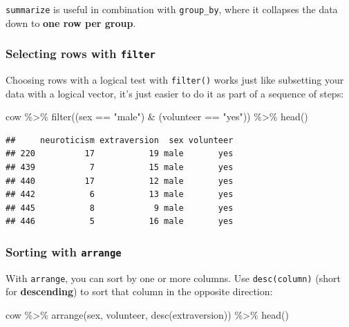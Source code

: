 \documentclass[
]{book}
\newenvironment{Shaded}{\begin{snugshade}}{\end{snugshade}}
\newcommand{\FunctionTok}[1]{\textcolor[rgb]{0.00,0.00,0.00}{#1}}
\newcommand{\NormalTok}[1]{#1}
\newcommand{\SpecialCharTok}[1]{\textcolor[rgb]{0.00,0.00,0.00}{#1}}
\newcommand{\StringTok}[1]{\textcolor[rgb]{0.31,0.60,0.02}{#1}}
\begin{document}
\texttt{summarize} is useful in combination with \texttt{group\_by}, where it
collapses the data down to \textbf{one row per group}.

\hypertarget{selecting-rows-with-filter}{%
\subsubsection*{\texorpdfstring{Selecting rows with \texttt{filter}}{Selecting rows with filter}}\label{selecting-rows-with-filter}}

Choosing rows with a logical test with \texttt{filter()} works just like
subsetting your data with a logical vector, it's just easier
to do it as part of a sequence of steps:

\begin{Shaded}
\begin{Highlighting}[]
\NormalTok{cow }\SpecialCharTok{\%\textgreater{}\%}
  \FunctionTok{filter}\NormalTok{((sex }\SpecialCharTok{==} \StringTok{"male"}\NormalTok{) }\SpecialCharTok{\&}\NormalTok{ (volunteer }\SpecialCharTok{==} \StringTok{"yes"}\NormalTok{)) }\SpecialCharTok{\%\textgreater{}\%}
  \FunctionTok{head}\NormalTok{()}
\end{Highlighting}
\end{Shaded}

\begin{verbatim}
##     neuroticism extraversion  sex volunteer
## 220          17           19 male       yes
## 439           7           15 male       yes
## 440          17           12 male       yes
## 442           6           13 male       yes
## 445           8            9 male       yes
## 446           5           16 male       yes
\end{verbatim}

\hypertarget{sorting-with-arrange}{%
\subsubsection*{\texorpdfstring{Sorting with \texttt{arrange}}{Sorting with arrange}}\label{sorting-with-arrange}}

With \texttt{arrange}, you can sort by one or more columns. Use \texttt{desc(column)}
(short for \textbf{descending}) to sort that column in the opposite direction:

\begin{Shaded}
\begin{Highlighting}[]
\NormalTok{cow }\SpecialCharTok{\%\textgreater{}\%}
  \FunctionTok{arrange}\NormalTok{(sex, volunteer, }\FunctionTok{desc}\NormalTok{(extraversion)) }\SpecialCharTok{\%\textgreater{}\%}
  \FunctionTok{head}\NormalTok{()}
\end{Highlighting}
\end{Shaded}
\end{document}
